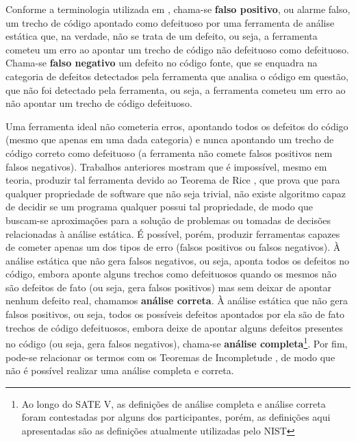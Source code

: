 Conforme a terminologia utilizada em \cite{sa_spec}, chama-se \textbf{falso positivo}, ou alarme falso, um trecho de código apontado como defeituoso por uma ferramenta de análise estática que, na verdade, não se trata de um defeito, ou seja, a ferramenta cometeu um erro ao apontar um trecho de código não defeituoso como defeituoso. Chama-se \textbf{falso negativo} um defeito no código fonte, que se enquadra na categoria de defeitos detectados pela ferramenta que analisa o código em questão, que não foi detectado pela ferramenta, ou seja, a ferramenta cometeu um erro ao não apontar um trecho de código defeituoso.

Uma ferramenta ideal não cometeria erros, apontando todos os defeitos do código (mesmo que apenas em uma dada categoria) e nunca apontando um trecho de código correto como defeituoso (a ferramenta não comete falsos positivos nem falsos negativos). Trabalhos anteriores mostram que é impossível, mesmo em teoria, produzir tal ferramenta \cite{sa_spec} devido ao Teorema de Rice \cite{rice}, que prova que para qualquer propriedade de software que não seja trivial, não existe algoritmo capaz de decidir se um programa qualquer possui tal propriedade, de modo que buscam-se aproximações para a solução de problemas ou tomadas de decisões relacionadas à análise estática. É possível, porém, produzir ferramentas capazes de cometer apenas um dos tipos de erro (falsos positivos ou falsos negativos). À análise estática que não gera falsos negativos, ou seja, aponta todos os defeitos no código, embora aponte alguns trechos como defeituosos quando os mesmos não são defeitos de fato (ou seja, gera falsos positivos) mas sem deixar de apontar nenhum defeito real, chamamos \textbf{análise correta}. À análise estática que não gera falsos positivos, ou seja, todos os possíveis defeitos apontados por ela são de fato trechos de código defeituosos, embora deixe de apontar alguns defeitos presentes no código (ou seja, gera falsos negativos), chama-se \textbf{análise completa}\footnote{Ao longo do SATE V, as definições de análise completa e análise correta foram contestadas por alguns dos participantes, porém, as definições aqui apresentadas são as definições atualmente utilizadas pelo NIST}. Por fim, pode-se relacionar os termos com os Teoremas de Incompletude \cite{godel}, de modo que não é possível realizar uma análise completa e correta.

